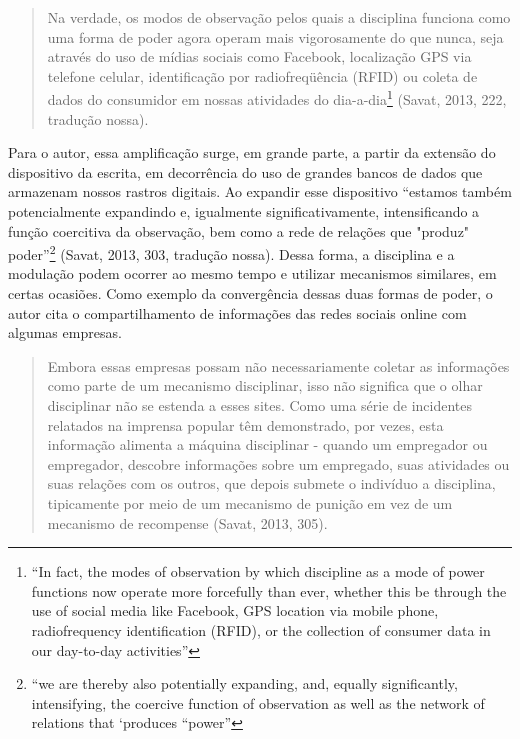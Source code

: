 \begin{quote}
Na verdade, os modos de observação pelos quais a disciplina funciona
como uma forma de poder agora operam mais vigorosamente do que nunca,
seja através do uso de mídias sociais como Facebook, localização GPS via
telefone celular, identificação por radiofreqüência (RFID) ou coleta de
dados do consumidor em nossas atividades do dia-a-dia\footnote{``In
  fact, the modes of observation by which discipline as a mode of power
  functions now operate more forcefully than ever, whether this be
  through the use of social media like Facebook, GPS location via mobile
  phone, radiofrequency identification (RFID), or the collection of
  consumer data in our day-to-day activities''}
\protect\hypertarget{__Fieldmark__1652_1356454502}{}{}(Savat, 2013, 222,
tradução
nossa)\protect\hypertarget{__Fieldmark__907_1743353457}{}{\protect\hypertarget{__Fieldmark__756_193002426}{}{}}.
\end{quote}

Para o autor, essa amplificação surge, em grande parte, a partir da
extensão do dispositivo da escrita, em decorrência do uso de grandes
bancos de dados que armazenam nossos rastros digitais. Ao expandir esse
dispositivo ``estamos também potencialmente expandindo e, igualmente
significativamente, intensificando a função coercitiva da observação,
bem como a rede de relações que "produz" poder''\footnote{``we are
  thereby also potentially expanding, and, equally significantly,
  intensifying, the coercive function of observation as well as the
  network of relations that `produces ``power''}
\protect\hypertarget{__Fieldmark__1698_1356454502}{}{}(Savat, 2013, 303,
tradução
nossa)\protect\hypertarget{__Fieldmark__936_1743353457}{}{\protect\hypertarget{__Fieldmark__798_193002426}{}{}}.
Dessa forma, a disciplina e a modulação podem ocorrer ao mesmo tempo e
utilizar mecanismos similares, em certas ocasiões. Como exemplo da
convergência dessas duas formas de poder, o autor cita o
compartilhamento de informações das redes sociais online com algumas
empresas.

\begin{quote}
Embora essas empresas possam não necessariamente coletar as informações
como parte de um mecanismo disciplinar, isso não significa que o olhar
disciplinar não se estenda a esses sites. Como uma série de incidentes
relatados na imprensa popular têm demonstrado, por vezes, esta
informação alimenta a máquina disciplinar - quando um empregador ou
empregador, descobre informações sobre um empregado, suas atividades ou
suas relações com os outros, que depois submete o indivíduo a
disciplina, tipicamente por meio de um mecanismo de punição em vez de um
mecanismo de recompense
\protect\hypertarget{__Fieldmark__1721_1356454502}{}{}(\protect\hypertarget{__Fieldmark__818_193002426}{}{}Savat,
2013, 305).
\end{quote}


